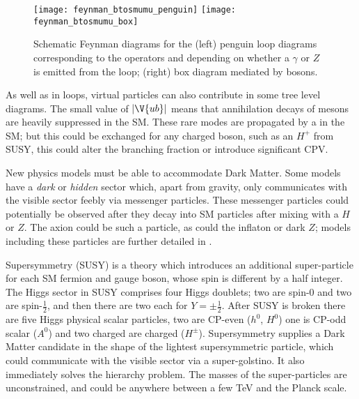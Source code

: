 \begin{figure}
  \begin{center}
    \texttt{[image: feynman\_btosmumu\_penguin]}
    \texttt{[image: feynman\_btosmumu\_box]}
    \caption{\small
      Schematic Feynman diagrams for the
      (left) penguin loop diagrams corresponding to the operators  and  depending on
      whether a $\gamma$ or $Z$ is emitted from the loop;
      (right)  box diagram mediated by \Wp bosons.
    }
    \label{fig:hhh:loops}
  \end{center}
\end{figure}

As well as in loops, virtual particles can also contribute in some tree level diagrams.
The small value of $|\V{ub}|$ means that annihilation decays of \Bp mesons are heavily
suppressed in the SM.
These rare modes are propagated by a \Wp in the SM; but this could be exchanged for any charged
boson, such as an $H^+$ from SUSY, this could alter the branching fraction or
introduce significant CPV.

New physics models must be able to accommodate Dark Matter.
Some models have a \emph{dark} or \emph{hidden} sector which, apart from gravity, only
communicates with the visible sector feebly via messenger particles.
These messenger particles could potentially be observed after they decay into SM particles after
mixing with a $H$ or $Z$.
The axion could be such a particle, as could the inflaton or dark $Z$; models including these
particles are further detailed in .

Supersymmetry (SUSY) is a theory which introduces an additional super-particle for each SM fermion and
gauge boson, whose spin is different by a half integer.
The Higgs sector in SUSY comprises four Higgs doublets; two are spin-0 and two are spin-$\tfrac12$,
and then there are two each for $Y=\pm\tfrac12$.
After SUSY is broken there are five Higgs physical scalar particles, two are CP-even ($h^0$,
$H^0$) one is CP-odd scalar ($A^0$) and two charged are charged ($H^\pm$).
Supersymmetry supplies a Dark Matter candidate in the shape of the lightest supersymmetric
particle, which could communicate with the visible sector via a super-golstino.
It also immediately solves the hierarchy problem.
The masses of the super-particles are unconstrained, and could be anywhere between a few TeV and
the Planck scale.


